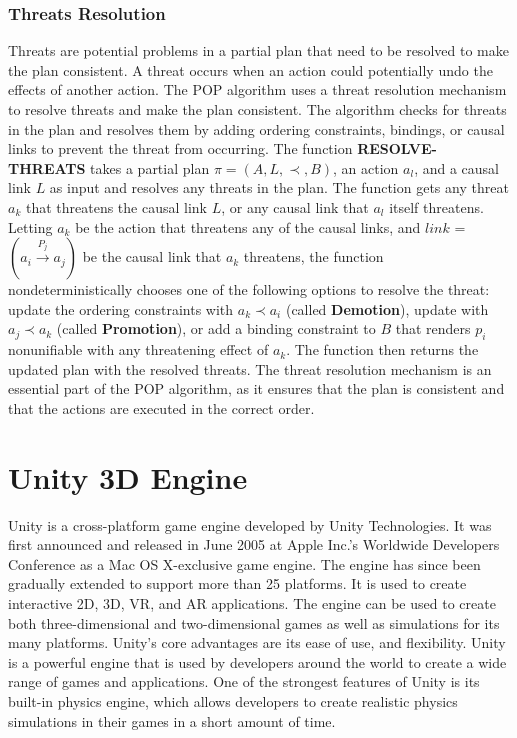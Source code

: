 \subsubsection{Threats Resolution} \label{subsubsec:threat_resolution}
Threats are potential problems in a partial plan that need to be resolved to make the plan consistent. A threat occurs when an action could potentially undo the effects of another action. The \ac{POP} algorithm uses a threat resolution mechanism to resolve threats and make the plan consistent. The algorithm checks for threats in the plan and resolves them by adding ordering constraints, bindings, or causal links to prevent the threat from occurring. The function \textbf{RESOLVE-THREATS} takes a partial plan $\pi = (A, L, \prec, B)$, an action $a_l$, and a causal link $L$ as input and resolves any threats in the plan.
The function gets any threat $a_k$ that threatens the causal link $L$, or any causal link that $a_l$ itself threatens. Letting $a_k$ be the action that threatens any of the causal links, and $link$ = $(a_i \xrightarrow{\text{$P_j$}} a_j)$ be the causal link that $a_k$ threatens, the function nondeterministically chooses one of the following options to resolve the threat: update the ordering constraints with $a_k \prec a_i$ (called \textbf{Demotion}), update with $a_j \prec a_k$ (called \textbf{Promotion}), or add a binding constraint to $B$ that renders $p_i$ nonunifiable with any threatening effect of $a_k$. The function then returns the updated plan with the resolved threats.
The threat resolution mechanism is an essential part of the \ac{POP} algorithm, as it ensures that the plan is consistent and that the actions are executed in the correct order.


\section{Unity 3D Engine} \label{sec:unity3d}
Unity is a cross-platform game engine developed by Unity Technologies. It was first announced and released in June 2005 at Apple Inc.'s Worldwide Developers Conference as a Mac OS X-exclusive game engine. The engine has since been gradually extended to support more than 25 platforms. It is used to create interactive 2D, 3D, VR, and AR applications. The engine can be used to create both three-dimensional and two-dimensional games as well as simulations for its many platforms. Unity's core advantages are its ease of use, and flexibility. Unity is a powerful engine that is used by developers around the world to create a wide range of games and applications.
One of the strongest features of Unity is its built-in physics engine, which allows developers to create realistic physics simulations in their games in a short amount of time.
